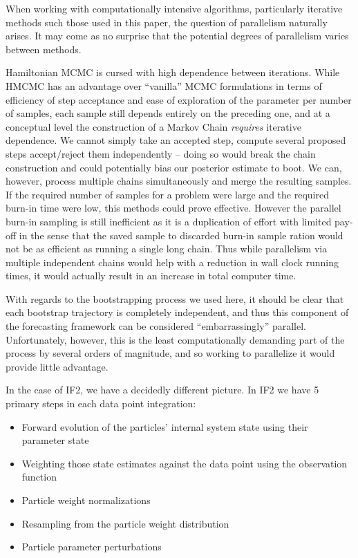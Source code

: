 	When working with computationally intensive algorithms, particularly iterative methods such those used in this paper, the question of parallelism naturally arises. It may come as no surprise that the potential degrees of parallelism varies between methods.

	Hamiltonian MCMC is cursed with high dependence between iterations. While HMCMC has an advantage over ``vanilla'' MCMC formulations in terms of efficiency of step acceptance and ease of exploration of the parameter per number of samples, each sample still depends entirely on the preceding one, and at a conceptual level the construction of a Markov Chain \textit{requires} iterative dependence. We cannot simply take an accepted step, compute several proposed steps accept/reject them independently -- doing so would break the chain construction and could potentially bias our posterior estimate to boot. We can, however, process multiple chains simultaneously and merge the resulting samples. If the required number of samples for a problem were large and the required burn-in time were low, this methods could prove effective. However the parallel burn-in sampling is still inefficient as it is a duplication of effort with limited pay-off in the sense that the saved sample to discarded burn-in sample ration would not be as efficient as running a single long chain. Thus while parallelism via multiple independent chains would help with a reduction in wall clock running times, it would actually result in an increase in total computer time.

	With regards to the bootstrapping process we used here, it should be clear that each bootstrap trajectory is completely independent, and thus this component of the forecasting framework can be considered ``embarrassingly'' parallel. Unfortunately, however, this is the least computationally demanding part of the process by several orders of magnitude, and so working to parallelize it would provide little advantage.

	In the case of IF2, we have a decidedly different picture. In IF2 we have 5 primary steps in each data point integration: 

	\begin{itemize}
		\item Forward evolution of the particles' internal system state using their parameter state
		\item Weighting those state estimates against the data point using the observation function
		\item Particle weight normalizations
		\item Resampling from the particle weight distribution
		\item Particle parameter perturbations
	\end{itemize}

